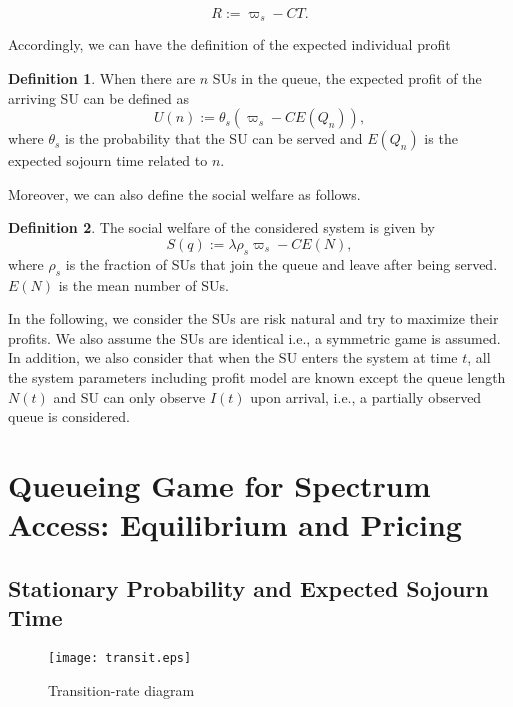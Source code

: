 \documentclass[journal]{IEEEtran}
\begin{document}
\begin{equation}
\label{eq:U} R := \varpi_{s} - CT.
\end{equation}

\noindent Accordingly, we can have the definition of the expected individual
profit

\theoremstyle{definition}
\newtheorem{definition}{Definition}
\begin{definition} When there are $n$ SUs in the queue, the expected profit of the arriving SU can be defined as
\begin{equation}
\label{eq:IP} U(n) :=  \theta_s (\varpi_s - C E(Q_n)),
\end{equation}
\noindent where $\theta_s$ is the probability that the SU can be
served and $E(Q_n)$ is the expected sojourn time related to $n$.
\end{definition}

\noindent Moreover, we can also define the social welfare as follows.

\begin{definition}
The social welfare of the considered system is given by
\begin{equation}
\label{eq:SPSO} S(q) := \lambda \rho_{s} \varpi_s - C E(N),
\end{equation}
\noindent where $\rho_{s}$ is the fraction of SUs that join the
queue and leave after being served. $E(N)$ is the mean number of
SUs.
\end{definition}

In the following, we consider the SUs are risk natural and try to
maximize their profits. We also assume the SUs are identical i.e.,
a symmetric game is assumed. In addition, we also consider that
when the SU enters the system at time $t$, all the system
parameters including profit model are known except the queue
length $N(t)$ and SU can only observe $I(t)$ upon arrival, i.e., a
partially observed queue is considered.

\section{Queueing Game for Spectrum Access: Equilibrium and Pricing}

\subsection{Stationary Probability and Expected Sojourn Time}

\begin{figure}[t]
\centering
\texttt{[image: transit.eps]}
\caption{Transition-rate diagram} \label{fig:2}
\end{figure}
\end{document}
